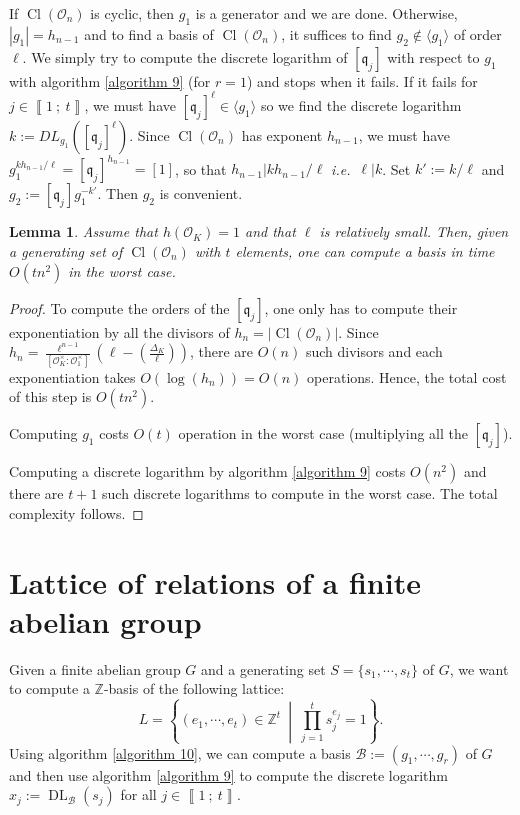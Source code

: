\documentclass[a4paper,10pt]{report}
\theoremstyle{definition}
\theoremstyle{plain}
\newtheorem{Lemma}[Definition]{Lemma}
\theoremstyle{definition}
\newcommand{\ie}{\emph{i.e.}\ }
\newcommand{\Z}{\mathbb{Z}}
\newcommand{\m}[1]{\mathcal{#1}}
\newcommand{\mO}{\mathcal{O}}
\renewcommand{\i}[2]{\left\llbracket #1~;~#2\right\rrbracket}
\renewcommand{\(}{\left(}
\renewcommand{\)}{\right)}
\newcommand{\mf}[1]{\mathfrak{#1}}
\DeclareMathOperator{\Cl}{Cl}
\DeclareMathOperator{\DL}{DL}
\begin{document}
If $\Cl(\mO_n)$ is cyclic, then $g_1$ is a generator and we are done. Otherwise, $|g_1|=h_{n-1}$ and to find a basis of $\Cl(\mO_n)$, it suffices to find $g_2\not\in \langle g_1\rangle$ of order $\ell$. We simply try to compute the discrete logarithm of $[\mf{q}_j]$ with respect to $g_1$ with algorithm \ref{algorithm 9} (for $r=1$) and stops when it fails. If it fails for $j\in\i{1}{t}$, we must have $[\mf{q}_j]^\ell\in\langle g_1\rangle$ so we find the discrete logarithm $k:=DL_{g_1}([\mf{q}_j]^\ell)$. Since $\Cl(\mO_n)$ has exponent $h_{n-1}$, we must have $g_1^{kh_{n-1}/\ell}=[\mf{q}_j]^{h_{n-1}}=[1]$, so that $h_{n-1}|kh_{n-1}/\ell$ \ie $\ell|k$. Set $k':=k/\ell$ and $g_2:=[\mf{q}_j]g_1^{-k'}$. Then $g_2$ is convenient.

\begin{Lemma}\label{Lemma 19}
Assume that $h(\mO_K)=1$ and that $\ell$ is relatively small. Then, given a generating set of $\Cl(\mO_n)$ with $t$ elements, one can compute a basis in time $O(tn^2)$ in the worst case. 
\end{Lemma}

\begin{proof}
To compute the orders of the $[\mf{q}_j]$, one only has to compute their exponentiation by all the divisors of $h_n=|\Cl(\mO_n)|$. Since $h_n=\frac{\ell^{n-1}}{[\mO_K^\times:\mO_1^\times]}\(\ell-\(\frac{\Delta_K}{\ell}\)\)$, there are $O(n)$ such divisors and each exponentiation takes $O(\log(h_n))=O(n)$ operations. Hence, the total cost of this step is $O(tn^2)$.

Computing $g_1$ costs $O(t)$ operation in the worst case (multiplying all the $[\mf{q}_j]$).

Computing a discrete logarithm by algorithm \ref{algorithm 9} costs $O(n^2)$ and there are $t+1$ such discrete logarithms to compute in the worst case. The total complexity follows.
\end{proof}

\section{Lattice of relations of a finite abelian group}

Given a finite abelian group $G$ and a generating set $S=\{s_1,\cdots, s_t\}$ of $G$, we want to compute a $\Z$-basis of the following lattice:
\[L=\left\{(e_1,\cdots,e_t)\in\Z^t \ \middle| \ \prod_{j=1}^t s_j^{e_j}=1\right\}.\]
Using algorithm \ref{algorithm 10}, we can compute a basis $\m{B}:=(g_1,\cdots, g_r)$ of $G$ and then use algorithm \ref{algorithm 9} to compute the discrete logarithm $x_j:=\DL_{\m{B}}(s_j)$ for all $j\in\i{1}{t}$. 
\end{document}
